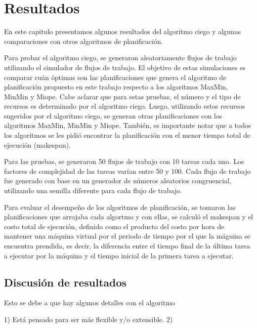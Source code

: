 \chapter{Resultados}

En este capitulo presentamos algunos resultados del algoritmo ciego y algunas comparaciones con otros algoritmos de planificación. 

Para probar el algoritmo ciego, se generaron aleatoriamente flujos de trabajo utilizando el simulador de flujos de trabajo. El objetivo de estas simulaciones es comparar cuán óptimas son las planificaciones que genera el algoritmo de planificación propuesto en este trabajo respecto a los algoritmos MaxMin, MinMin y Miope. Cabe aclarar que para estas pruebas, el número y el tipo de recursos es determinado por el algoritmo ciego. Luego, utilizando estos recursos sugeridos por el algoritmo ciego, se generan otras planificaciones con los algoritmos MaxMin, MinMin y Miope. También, es importante notar que a todos los algoritmos se les pidió encontrar la planificación con el menor tiempo total de ejecución (makespan). 

Para las pruebas, se generaron 50 flujos de trabajo con 10 tareas cada uno. Los factores de complejidad de las tareas varían entre 50 y 100. Cada flujo de trabajo fue generado con base en un generador de números aleatorios congruencial, utilizando una semilla diferente para cada flujo de trabajo.

Para evaluar el desempeño de los algoritmos de planificación, se tomaron las planificaciones que arrojaba cada algortmo y con ellas, se calculó el makespan y el costo total de ejecución, definido como el producto del costo por hora de mantener una máquina virtual por el periodo de tiempo por el que la máguina se encuentra prendida, es decir, la diferencia entre el tiempo final de la última tarea a ejecutar por la máquina y el tiempo inicial de la primera tarea a ejecutar.





\section{Discusión de resultados}

Esto se debe a que hay algunos detalles con el algoritmo

1) Está pensado para ser más flexible y/o extensible.
2)
